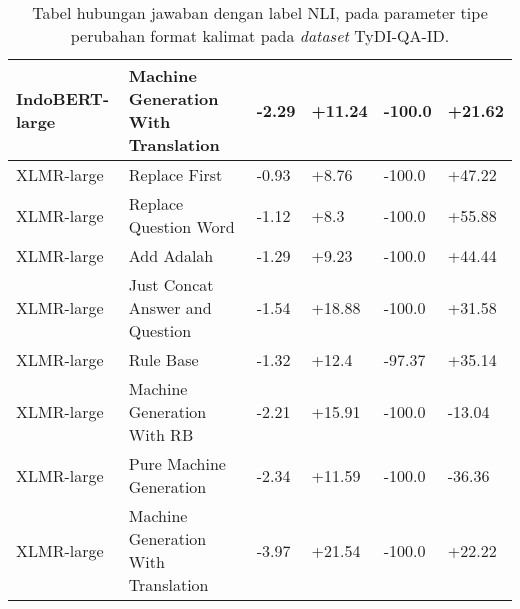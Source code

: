 \begin{table}[H]
\begin{tabular}{llllll}
IndoBERT-large & Machine Generation With Translation &        -2.29 &       +11.24 &      -100.0 &      +21.62 \\
\hline
    XLMR-large &                       Replace First &        -0.93 &        +8.76 &      -100.0 &      +47.22 \\
    XLMR-large &               Replace Question Word &        -1.12 &         +8.3 &      -100.0 &      +55.88 \\
    XLMR-large &                          Add Adalah &        -1.29 &        +9.23 &      -100.0 &      +44.44 \\
    XLMR-large &     Just Concat Answer and Question &        -1.54 &       +18.88 &      -100.0 &      +31.58 \\
    XLMR-large &                           Rule Base &        -1.32 &        +12.4 &      -97.37 &      +35.14 \\
    XLMR-large &          Machine Generation With RB &        -2.21 &       +15.91 &      -100.0 &      -13.04 \\
    XLMR-large &             Pure Machine Generation &        -2.34 &       +11.59 &      -100.0 &      -36.36 \\
    XLMR-large & Machine Generation With Translation &        -3.97 &       +21.54 &      -100.0 &      +22.22 \\
\bottomrule
\end{tabular}
\caption{Tabel hubungan jawaban dengan label NLI, pada parameter tipe perubahan format kalimat pada \emph{dataset} TyDI-QA-ID.}
\end{table}

